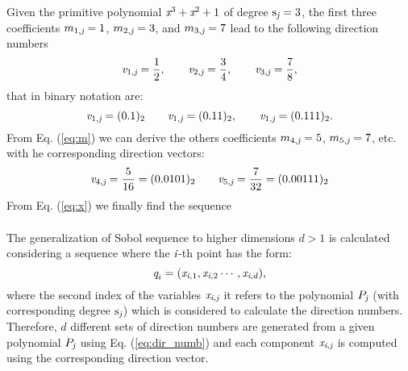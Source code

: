 Given the primitive polynomial $\textit{x}^3+\textit{x}^2+1$ of degree $\textrm{s}_{\textit{j}}=3$, the first three coefficients $m_{1, \textit{j}}=1$, 
$m_{2, \textit{j}}=3$, and $m_{3, \textit{j}}=7$ lead to the following direction numbers 
\begin{equation}
\textit{v}_{1,\textit{j}} = \frac{1}{2}, \qquad \textit{v}_{2,\textit{j}} = \frac{3}{4}, \qquad \textit{v}_{3,\textit{j}}= \frac{7}{8},
\end{equation}
that in binary notation are:
\begin{equation}
\textit{v}_{1,\textit{j}} = (0.1)_2 \qquad \textit{v}_{1,\textit{j}} = (0.11)_2, \qquad \textit{v}_{1,\textit{j}} = (0.111)_2.
\end{equation}
From Eq. (\ref{eq:m}) we can derive the others coefficients $m_{4,\textit{j}}=5$, $m_{5,\textit{j}}=7$, etc. with he corresponding direction vectors:
\begin{equation}
\textit{v}_{4,\textit{j}} = \frac{5}{16} = (0.0101)_2  \qquad \textit{v}_{5,\textit{j}} = \frac{7}{32}=(0.00111)_2
\end{equation}
From Eq. (\ref{eq:x}) we finally find the sequence
\begin{equation}
\end{equation}
\\ \indent
The generalization of Sobol sequence to higher dimensions $d>1$ is calculated considering a sequence where the $\textit{i}$-th point has the form:
\begin{equation}
\textit{q}_{i} = (\textit{x}_{\textit{i}, 1},\textit{x}_{\textit{i}, 2} \cdots, \textit{x}_{\textit{i}, d}),
\end{equation}
where the second index of the variables $\textit{x}_{\textit{i}, \textit{j}}$ it refers to the polynomial $P_{\textit{j}}$ (with corresponding degree $\textrm{s}_{\textit{j}}$) which is considered to calculate the direction numbers. Therefore, $d$ different sets of direction numbers are generated from a given polynomial $P_{\textit{j}}$ using Eq. (\ref{eq:dir_numb}) and each component $\textit{x}_{\textit{i},\textit{j}}$ is computed using the corresponding direction vector. 